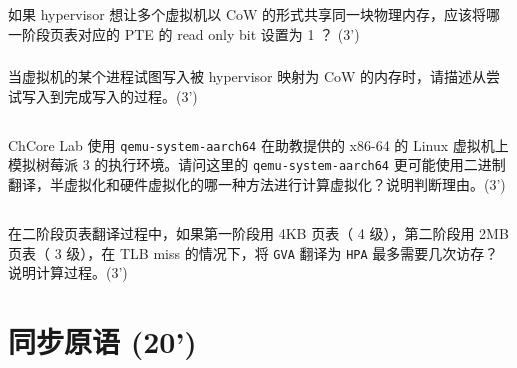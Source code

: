 \documentclass[a4paper,12pt]{article}
\newcommand{\score}[1]{(#1')}
\begin{document}
\subsubsection{}

如果 hypervisor 想让多个虚拟机以 CoW 的形式共享同一块物理内存，应该将哪一阶段页表对应的 PTE 的 read only bit 设置为 1 ？ \score{3}

\begin{answer}
  \lipsum[3]
\end{answer}

\subsubsection{}

当虚拟机的某个进程试图写入被 hypervisor 映射为 CoW 的内存时，请描述从尝试写入到完成写入的过程。\score{3}

\begin{answer}
  \lipsum[3]
\end{answer}

\subsection{}

ChCore Lab 使用 \verb|qemu-system-aarch64| 在助教提供的 x86-64 的 Linux 虚拟机上模拟树莓派 3 的执行环境。请问这里的 \verb|qemu-system-aarch64| 更可能使用二进制翻译，半虚拟化和硬件虚拟化的哪一种方法进行计算虚拟化？说明判断理由。\score{3}

\begin{answer}
  \lipsum[3]
\end{answer}

\subsection{}

在二阶段页表翻译过程中，如果第一阶段用 4KB 页表（ 4 级），第二阶段用 2MB 页表（ 3 级），在 TLB miss 的情况下，将 \verb|GVA| 翻译为 \verb|HPA| 最多需要几次访存？说明计算过程。\score{3}

\begin{answer}
  \lipsum[3]
\end{answer}

\section{同步原语 \score{20}}

\subsection{}
\end{document}
